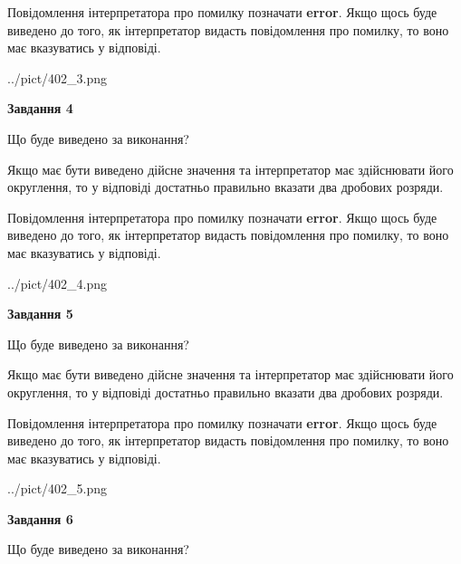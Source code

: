 \documentclass[12pt, ukrainian]{article}
\begin{document}
{\begin {Large}
Повідомлення інтерпретатора про помилку позначати \textbf{error}.
Якщо щось буде виведено до того, як інтерпретатор видасть повідомлення про помилку, 
то воно має вказуватись у відповіді. \par

\begin{center}
	{../pict/402_3.png}
\end{center}
\newpage

{\begin {center}\textbf{Завдання 4}\end {center}}\par
Що буде виведено за виконання? \par

Якщо має бути виведено дійсне значення та інтерпретатор має здійснювати його округлення, 
то у відповіді достатньо правильно вказати два дробових розряди.

Повідомлення інтерпретатора про помилку позначати \textbf{error}.
Якщо щось буде виведено до того, як інтерпретатор видасть повідомлення про помилку, 
то воно має вказуватись у відповіді. \par

\begin{center}
	{../pict/402_4.png}
\end{center}
\newpage

{\begin {center}\textbf{Завдання 5}\end {center}}\par
Що буде виведено за виконання? \par

Якщо має бути виведено дійсне значення та інтерпретатор має здійснювати його округлення, 
то у відповіді достатньо правильно вказати два дробових розряди.

Повідомлення інтерпретатора про помилку позначати \textbf{error}.
Якщо щось буде виведено до того, як інтерпретатор видасть повідомлення про помилку, 
то воно має вказуватись у відповіді. \par

\begin{center}
	{../pict/402_5.png}
\end{center}
\newpage

{\begin {center}\textbf{Завдання 6}\end {center}}\par
Що буде виведено за виконання? \par


\end{Large}}
\end{document}
